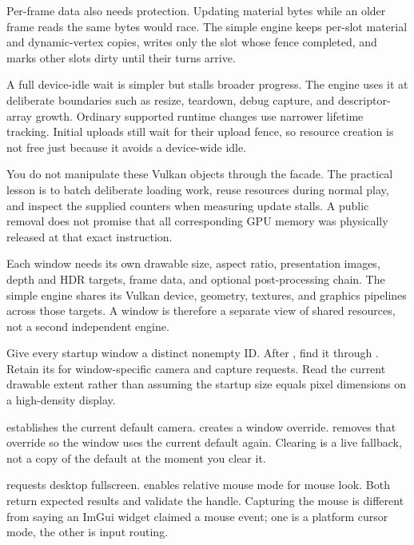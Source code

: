 \documentclass[11pt,a4paper]{article}
\begin{document}
Per-frame data also needs protection. Updating material bytes while an older frame reads the same bytes would race. The simple engine keeps per-slot material and dynamic-vertex copies, writes only the slot whose fence completed, and marks other slots dirty until their turns arrive.

A full device-idle wait is simpler but stalls broader progress. The engine uses it at deliberate boundaries such as resize, teardown, debug capture, and descriptor-array growth. Ordinary supported runtime changes use narrower lifetime tracking. Initial uploads still wait for their upload fence, so resource creation is not free just because it avoids a device-wide idle.

You do not manipulate these Vulkan objects through the facade. The practical lesson is to batch deliberate loading work, reuse resources during normal play, and inspect the supplied counters when measuring update stalls. A public removal does not promise that all corresponding GPU memory was physically released at that exact instruction.

Each window needs its own drawable size, aspect ratio, presentation images, depth and HDR targets, frame data, and optional post-processing chain. The simple engine shares its Vulkan device, geometry, textures, and graphics pipelines across those targets. A window is therefore a separate view of shared resources, not a second independent engine.

Give every startup window a distinct nonempty ID. After , find it through . Retain its  for window-specific camera and capture requests. Read the current drawable extent rather than assuming the startup size equals pixel dimensions on a high-density display.

 establishes the current default camera.  creates a window override.  removes that override so the window uses the current default again. Clearing is a live fallback, not a copy of the default at the moment you clear it.

 requests desktop fullscreen.  enables relative mouse mode for mouse look. Both return expected results and validate the handle. Capturing the mouse is different from saying an ImGui widget claimed a mouse event; one is a platform cursor mode, the other is input routing.
\end{document}
